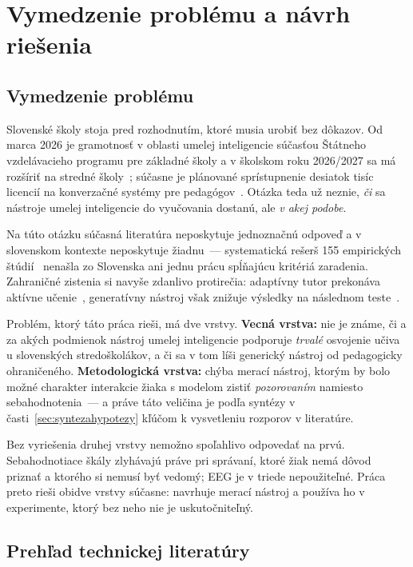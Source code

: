 \chapter{Vymedzenie problému a návrh riešenia}
\label{chapter:problem}

\section{Vymedzenie problému}
\label{sec:problem}

Slovenské školy stoja pred rozhodnutím, ktoré musia urobiť bez dôkazov. Od marca 2026 je gramotnosť v oblasti umelej inteligencie súčasťou Štátneho vzdelávacieho programu pre základné školy a v školskom roku 2026/2027 sa má rozšíriť na stredné školy~\cite{minedu2025plan}; súčasne je plánované sprístupnenie desiatok tisíc licencií na konverzačné systémy pre pedagógov~\cite{drucker2026competence}. Otázka teda už neznie, \emph{či} sa nástroje umelej inteligencie do vyučovania dostanú, ale \emph{v akej podobe}.

Na túto otázku súčasná literatúra neposkytuje jednoznačnú odpoveď a v slovenskom kontexte neposkytuje žiadnu~--- systematická rešerš 155 empirických štúdií~\cite{garzon2025systematic} nenašla zo Slovenska ani jednu prácu spĺňajúcu kritériá zaradenia. Zahraničné zistenia si navyše zdanlivo protirečia: adaptívny tutor prekonáva aktívne učenie~\cite{kestin2025aitutoring}, generatívny nástroj však znižuje výsledky na následnom teste~\cite{bastani2025harm}.

Problém, ktorý táto práca rieši, má dve vrstvy. \textbf{Vecná vrstva:} nie je známe, či a za akých podmienok nástroj umelej inteligencie podporuje \emph{trvalé} osvojenie učiva u slovenských stredoškolákov, a či sa v tom líši generický nástroj od pedagogicky ohraničeného. \textbf{Metodologická vrstva:} chýba merací nástroj, ktorým by bolo možné charakter interakcie žiaka s modelom zistiť \emph{pozorovaním} namiesto sebahodnotenia~--- a práve táto veličina je podľa syntézy v časti~\ref{sec:syntezahypotezy} kľúčom k vysvetleniu rozporov v literatúre.

Bez vyriešenia druhej vrstvy nemožno spoľahlivo odpovedať na prvú. Sebahodnotiace škály zlyhávajú práve pri správaní, ktoré žiak nemá dôvod priznať a ktorého si nemusí byť vedomý; EEG je v triede nepoužiteľné. Práca preto rieši obidve vrstvy súčasne: navrhuje merací nástroj a používa ho v experimente, ktorý bez neho nie je uskutočniteľný.

\section{Prehľad technickej literatúry}
\label{sec:techlit}

